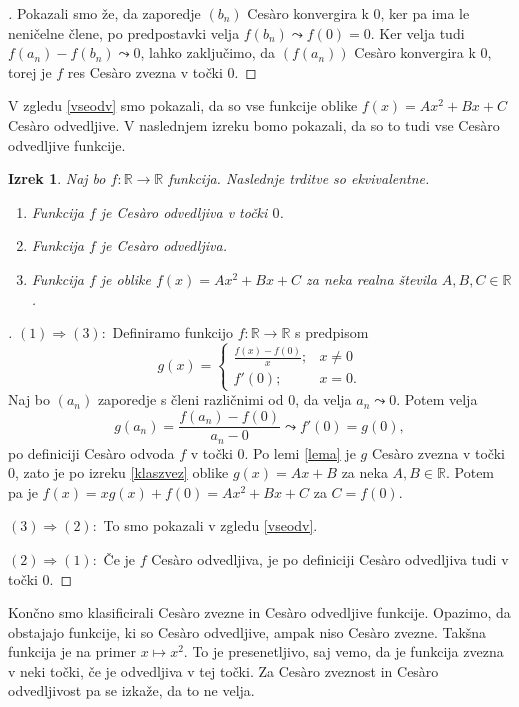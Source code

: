 \documentclass[a4paper,12pt]{article}
\theoremstyle{definition}
\theoremstyle{plain}
\newtheorem{izrek}{Izrek}
\newenvironment{dokaz}{\begin{proof}[\bfseries\upshape\proofname]}{\end{proof}}
\begin{document}
\begin{dokaz}
    Pokazali smo že, da zaporedje $(b_n)$ Ces\`{a}ro konvergira k $0$, ker pa ima le neničelne člene, po predpostavki velja $f(b_n) \leadsto f(0) = 0$. Ker velja tudi $f(a_n) - f(b_n) \leadsto 0$, lahko zaključimo, da $(f(a_n))$ Ces\`{a}ro konvergira k $0$, torej je $f$ res Ces\`{a}ro zvezna v točki $0$.
\end{dokaz}

V zgledu \ref{vseodv} smo pokazali, da so vse funkcije oblike $f(x) = Ax^2 + Bx + C$ Ces\`{a}ro odvedljive. V naslednjem izreku bomo pokazali, da so to tudi vse Ces\`{a}ro odvedljive funkcije.

\begin{izrek}
    \label{klasodv}
    Naj bo $f: \mathbb{R} \rightarrow \mathbb{R}$ funkcija. Naslednje trditve so ekvivalentne.
    \begin{enumerate}
        \item Funkcija $f$ je Ces\`{a}ro odvedljiva v točki $0$.
        \item Funkcija $f$ je Ces\`{a}ro odvedljiva.
        \item Funkcija $f$ je oblike $f(x) = Ax^2 + Bx + C$ za neka realna števila $A, B, C \in \mathbb{R}$.
    \end{enumerate}
\end{izrek}
\begin{dokaz}
    $(1) \Rightarrow (3): $ Definiramo funkcijo $f: \mathbb{R} \rightarrow \mathbb{R}$ s predpisom 
    $$
    g(x) = \begin{cases}
        \frac{f(x)-f(0)}{x}; & x \neq 0\\
        f'(0); & x = 0.
    \end{cases}
    $$
    Naj bo $(a_n)$ zaporedje s členi različnimi od $0$, da velja $a_n \leadsto 0$. Potem velja 
    $$g(a_n) = \frac{f(a_n)-f(0)}{a_n-0} \leadsto f'(0) = g(0),$$
    po definiciji Ces\`{a}ro odvoda $f$ v točki $0$. Po lemi \ref{lema} je $g$ Ces\`{a}ro zvezna v točki $0$, zato je po izreku \ref{klaszvez} oblike $g(x) = Ax + B$ za neka $A, B \in \mathbb{R}$. Potem pa je 
    $f(x) = xg(x) + f(0) = Ax^2 + Bx + C$ za $C = f(0)$.

    $(3) \Rightarrow (2): $ To smo pokazali v zgledu \ref{vseodv}.

    $(2) \Rightarrow (1): $ Če je $f$ Ces\`{a}ro odvedljiva, je po definiciji Ces\`{a}ro odvedljiva tudi v točki $0$.
\end{dokaz}

Končno smo klasificirali Ces\`{a}ro zvezne in Ces\`{a}ro odvedljive funkcije. Opazimo, da obstajajo funkcije, ki so Ces\`{a}ro odvedljive, ampak niso Ces\`{a}ro zvezne. Takšna funkcija je na primer $x \mapsto x^2$. To je presenetljivo, saj vemo, da je funkcija zvezna v neki točki, če je odvedljiva v tej točki. Za Ces\`{a}ro zveznost in Ces\`{a}ro odvedljivost pa se izkaže, da to ne velja.
\end{document}
